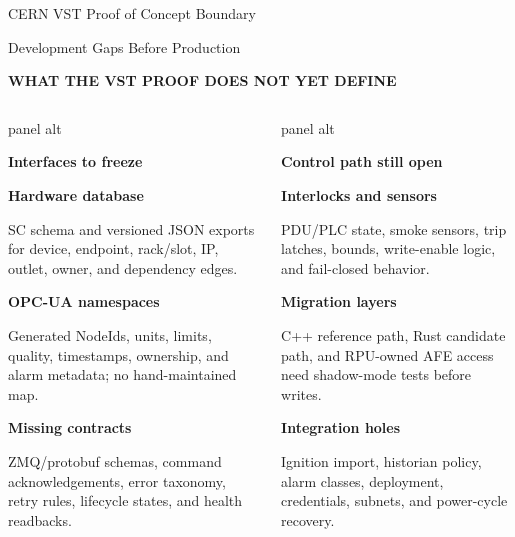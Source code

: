 \documentclass[aspectratio=169,10pt]{beamer}
\newcommand{\eyebrow}[1]{{\color{noircyan}\small\bfseries #1\par}}
\newcommand{\gapline}[2]{%
  {\footnotesize\bfseries\textcolor{pendingorange}{#1}\par}
  \vspace{0.25mm}
  {\scriptsize #2\par}
  \vspace{0.9mm}
}
\begin{document}
{\begin{frame}[t]{CERN VST Proof of Concept Boundary}
\end{frame}
}

\begin{frame}[t]{Development Gaps Before Production}
\eyebrow{WHAT THE VST PROOF DOES NOT YET DEFINE}
\vspace{1.4mm}

\begin{columns}[T,onlytextwidth]
\begin{beamercolorbox}[wd=\linewidth,sep=5pt,rounded=true]{panel alt}
{\small\bfseries\textcolor{noircyan}{Interfaces to freeze}\par}
\vspace{1mm}
\gapline{Hardware database}{
SC schema and versioned JSON exports for device, endpoint, rack/slot, IP, outlet, owner, and dependency edges.
}
\gapline{OPC-UA namespaces}{
Generated NodeIds, units, limits, quality, timestamps, ownership, and alarm metadata; no hand-maintained map.
}
\gapline{Missing contracts}{
ZMQ/protobuf schemas, command acknowledgements, error taxonomy, retry rules, lifecycle states, and health readbacks.
}
\end{beamercolorbox}

\begin{beamercolorbox}[wd=\linewidth,sep=5pt,rounded=true]{panel alt}
{\small\bfseries\textcolor{noircyan}{Control path still open}\par}
\vspace{1mm}
\gapline{Interlocks and sensors}{
PDU/PLC state, smoke sensors, trip latches, bounds, write-enable logic, and fail-closed behavior.
}
\gapline{Migration layers}{
C++ reference path, Rust candidate path, and RPU-owned AFE access need shadow-mode tests before writes.
}
\gapline{Integration holes}{
Ignition import, historian policy, alarm classes, deployment, credentials, subnets, and power-cycle recovery.
}
\end{beamercolorbox}
\end{columns}
\end{frame}
\end{document}
